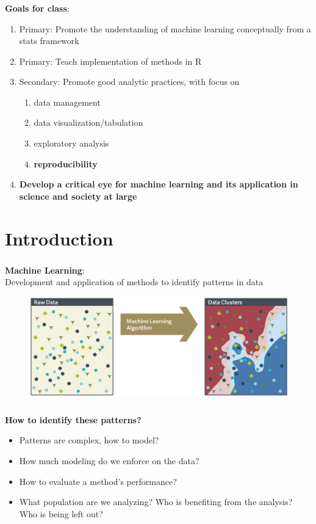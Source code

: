 \documentclass[xcolor=dvipsnames]{beamer}
\begin{document}
\begin{frame}
\frametitle{\insertsectionhead}
\textbf{Goals for class}:
\begin{enumerate}
\item Primary: Promote the understanding of machine learning conceptually from a stats framework
\item Primary: Teach implementation of methods in R
\item Secondary: Promote good analytic practices, with focus on
\begin{enumerate}
\item data management
\item data visualization/tabulation
\item exploratory analysis
\item \textbf{reproducibility}
\end{enumerate}
\item \textbf{Develop a critical eye for machine learning and its application in science and society at large}
\end{enumerate}
\end{frame}

\section{Introduction}
\begin{frame}
\frametitle{\insertsectionhead}
\textbf{Machine Learning}:\\
Development and application of methods to identify patterns in data
\begin{figure}
\includegraphics[scale=0.45]{images/ml_first_ex.png}
\end{figure}
\end{frame}

\begin{frame}
\frametitle{\insertsectionhead}
\textbf{How to identify these patterns?}
\begin{itemize}
\item Patterns are complex, how to model?
\item How much modeling do we enforce on the data?
\item How to evaluate a method's performance?
\item What population are we analyzing?  Who is benefiting from the analysis?  Who is being left out?
\end{itemize}
\end{frame}
\end{document}
